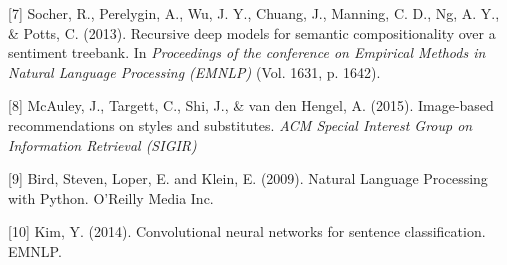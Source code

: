 \documentclass{article} %
\begin{document}
{[7] Socher, R., Perelygin, A., Wu, J. Y., Chuang, J., Manning, C. D., Ng, A. Y., \& Potts, C. (2013). Recursive deep models for semantic compositionality over a sentiment treebank. In {\it Proceedings of the conference on Empirical Methods in Natural Language Processing (EMNLP)} (Vol. 1631, p. 1642).






[8] McAuley, J., Targett, C., Shi, J., \& van den Hengel, A. (2015). Image-based recommendations on styles and substitutes. {\it ACM Special Interest Group on Information Retrieval (SIGIR)}

[9] Bird, Steven, Loper, E. and Klein, E. (2009). Natural Language Processing with Python. O'Reilly Media Inc.

[10] Kim, Y. (2014). Convolutional neural networks for sentence classification. EMNLP.



%
%



}
\end{document}

